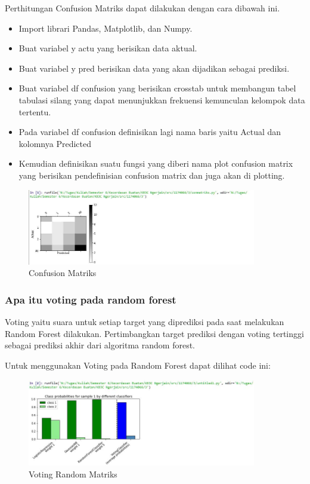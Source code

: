\hfill\break
Perthitungan Confusion Matriks dapat dilakukan dengan cara dibawah ini.
\begin{itemize}
\item
Import librari Pandas, Matplotlib, dan Numpy.
\item
Buat variabel y actu yang berisikan data aktual.
\item
Buat variabel y pred berisikan data yang akan dijadikan sebagai prediksi.
\item
Buat variabel df confusion yang berisikan crosstab untuk membangun tabel tabulasi silang yang dapat menunjukkan frekuensi kemunculan kelompok data tertentu.
\item
Pada variabel df confusion definisikan lagi nama baris yaitu Actual dan kolomnya Predicted
\item
Kemudian definisikan suatu fungsi yang diberi nama plot confusion matrix yang berisikan pendefinisian confusion matrix dan juga akan di plotting.

\end{itemize}
\begin{figure}[H]
\centerline{\includegraphics[width=10cm]{figures/1174066/3/2.jpg}}
\caption{Confusion Matriks}
\label{labelgambar}
\end{figure}

\subsubsection{Apa itu voting pada random forest}

\hfill\break
Voting yaitu suara untuk setiap target yang diprediksi pada saat melakukan Random Forest dilakukan. Pertimbangkan target prediksi dengan voting tertinggi sebagai prediksi akhir dari algoritma random forest.

Untuk menggunakan Voting pada Random Forest dapat dilihat code ini:

\begin{figure}[H]
\centerline{\includegraphics[width=10cm]{figures/1174066/3/3.jpg}}
\caption{Voting Random Matriks}
\label{labelgambar}
\end{figure}


